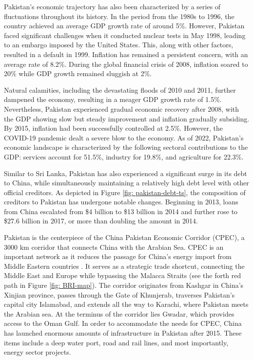 Pakistan's economic trajectory has also been characterized by a series of fluctuations throughout its history. In the period from the 1980s to 1996, the country achieved an average GDP growth rate of around 5\%. However, Pakistan faced significant challenges when it conducted nuclear tests in May 1998, leading to an embargo imposed by the United States. This, along with other factors, resulted in a default in 1999. Inflation has remained a persistent concern, with an average rate of 8.2\%. During the global financial crisis of 2008, inflation soared to 20\% while GDP growth remained sluggish at 2\%.

Natural calamities, including the devastating floods of 2010 and 2011, further dampened the economy, resulting in a meager GDP growth rate of 1.5\%. Nevertheless, Pakistan experienced gradual economic recovery after 2008, with the GDP showing slow but steady improvement and inflation gradually subsiding. By 2015, inflation had been successfully controlled at 2.5\%. However, the COVID-19 pandemic dealt a severe blow to the economy. As of 2022, Pakistan's economic landscape is characterized by the following sectoral contributions to the GDP: services account for 51.5\%, industry for 19.8\%, and agriculture for 22.3\%.

Similar to Sri Lanka, Pakistan has also experienced a significant surge in its debt to China, while simultaneously maintaining a relatively high debt level with other official creditors. As depicted in Figure \ref{fig: pakistan-debt-ts}, the composition of creditors to Pakistan has undergone notable changes.  Beginning in 2013, loans from China escalated from \$4 billion to \$13 billion in 2014 and further rose to \$27.6 billion in 2017, or more than doubling the amount in 2014.


Pakistan is the centerpiece of the China Pakistan Economic Corridor (CPEC), a 3000 km corridor that connects China with the Arabian Sea.
CPEC is an important network as it reduces the passage for China's energy import from Middle Eastern countries \citep*{CPEC-wiki}.
It serves as a strategic trade shortcut, connecting the Middle East and Europe while bypassing the Malacca Straits (see the forth red path in Figure \ref{fig: BRI-map}). The corridor originates from Kashgar in China's Xinjian province, passes through the Gate of Khunjerab, traverses Pakistan's capital city Islamabad, and extends all the way to Karachi, where Pakistan meets the Arabian sea. At the terminus of the corridor lies Gwadar, which provides access to the Oman Gulf.
In order to accommodate the needs for CPEC, China has launched enormous amounts of infrastructure in Pakistan after 2015. These items include a deep water port, road and rail lines, and most importantly, energy sector projects.

